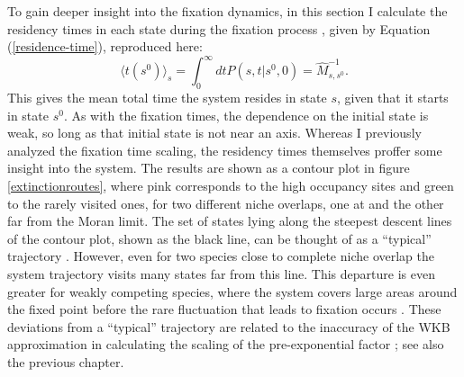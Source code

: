 To gain deeper insight into the fixation dynamics, in this section I calculate the residency times in each state during the fixation process \cite{Grinstead2003}, given by Equation (\ref{residence-time}), reproduced here:
\begin{equation*}
\langle t(s^0)\rangle_s = \int_0^{\infty} dt P(s,t|s^0,0)=\hat{M}^{-1}_{s,s^0}.
\end{equation*}
This gives the mean total time the system resides in state $s$, given that it starts in state $s^0$. 
As with the fixation times, the dependence on the initial state is weak, so long as that initial state is not near an axis. 
Whereas I previously analyzed the fixation time scaling, the residency times themselves proffer some insight into the system. 
The results are shown as a contour plot in figure \ref{extinctionroutes}, where  pink  corresponds to the high occupancy sites and green to the rarely visited ones, for two different niche overlaps, one at and the other far from the Moran limit. 
The set of states lying along the steepest descent lines of the contour plot, shown as the black line, can be thought of as a ``typical'' trajectory \cite{Gabel2013,Matkowsky1984,Kessler2007,McKane2004,Baxter2005}. 
However, even for two species close to complete niche overlap the system trajectory visits many states far from this line. 
This departure is even greater for weakly competing species, where the system covers large areas around the fixed point before the rare fluctuation that leads to fixation occurs \cite{Gottesman2012}. 
These deviations from a ``typical'' trajectory are related to the inaccuracy of the WKB approximation in calculating the scaling of the pre-exponential factor \cite{Assaf2016,Gottesman2012,Lande1993,Assaf2010}; see also the previous chapter. %

